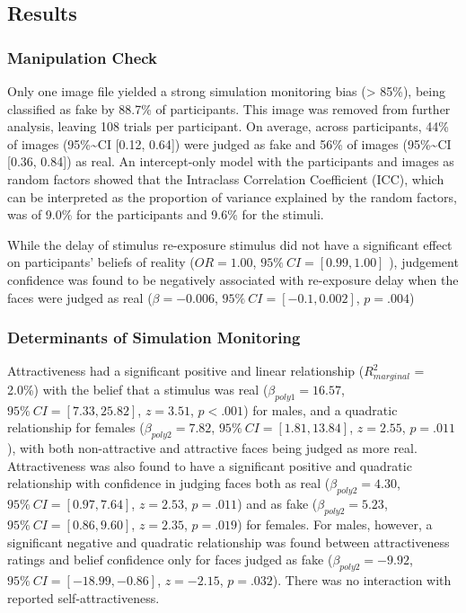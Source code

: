 \documentclass[
  man,floatsintext]{apa6}
\begin{document}
\hypertarget{results}{%
\subsection{Results}\label{results}}

\hypertarget{manipulation-check}{%
\subsubsection{Manipulation Check}\label{manipulation-check}}

Only one image file yielded a strong simulation monitoring bias (\textgreater{} 85\%), being classified as fake by 88.7\% of participants. This image was removed from further analysis, leaving 108 trials per participant. On average, across participants, 44\% of images (95\%\textasciitilde CI {[}0.12, 0.64{]}) were judged as fake and 56\% of images (95\%\textasciitilde CI {[}0.36, 0.84{]}) as real. An intercept-only model with the participants and images as random factors showed that the Intraclass Correlation Coefficient (ICC), which can be interpreted as the proportion of variance explained by the random factors, was of 9.0\% for the participants and 9.6\% for the stimuli.

While the delay of stimulus re-exposure stimulus did not have a significant effect on participants' beliefs of reality (\(OR = 1.00\), \(95\%~CI = [0.99, 1.00]\) ), judgement confidence was found to be negatively associated with re-exposure delay when the faces were judged as real (\(\beta = -0.006\), \(95\%~CI = [-0.1, 0.002]\), \(p = .004\))

\hypertarget{determinants-of-simulation-monitoring}{%
\subsubsection{Determinants of Simulation Monitoring}\label{determinants-of-simulation-monitoring}}

Attractiveness had a significant positive and linear relationship (\(R^2_{marginal}\) = 2.0\%) with the belief that a stimulus was real (\(\beta_{poly1} = 16.57\), \(95\%~CI = [7.33, 25.82]\), \(z = 3.51\), \(p < .001\)) for males, and a quadratic relationship for females (\(\beta_{poly2} = 7.82\), \(95\%~CI = [1.81, 13.84]\), \(z = 2.55\), \(p = .011\)), with both non-attractive and attractive faces being judged as more real. Attractiveness was also found to have a significant positive and quadratic relationship with confidence in judging faces both as real (\(\beta_{poly2} = 4.30\), \(95\%~CI = [0.97, 7.64]\), \(z = 2.53\), \(p = .011\)) and as fake (\(\beta_{poly2} = 5.23\), \(95\%~CI = [0. 86, 9.60]\), \(z = 2.35\), \(p = .019\)) for females. For males, however, a significant negative and quadratic relationship was found between attractiveness ratings and belief confidence only for faces judged as fake (\(\beta_{poly2} = -9.92\), \(95\%~CI = [-18.99, -0.86]\), \(z = -2.15\), \(p = .032\)). There was no interaction with reported self-attractiveness.
\end{document}
